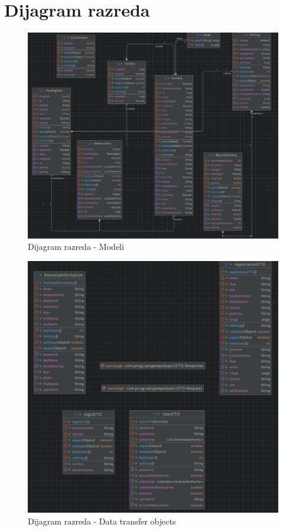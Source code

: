 \eject


\section{Dijagram razreda}

\begin{figure}[H]
	\includegraphics[width=\textwidth]{slike/models.png} %
	\centering
	\caption{Dijagram razreda - Modeli}
\end{figure}

\begin{figure}[H]
	\includegraphics[width=\textwidth]{slike/dto.png} %
	\centering
	\caption{Dijagram razreda - Data transfer objects}
	\label{fig:dijagramrazreda2}
\end{figure}




